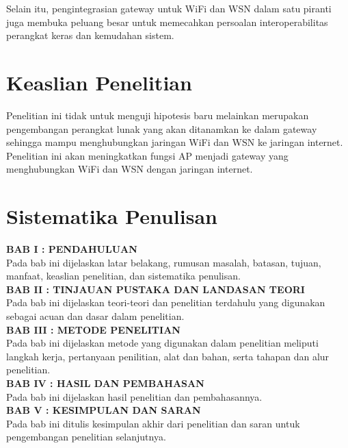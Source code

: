 Selain itu, pengintegrasian gateway untuk WiFi dan WSN dalam satu piranti juga membuka peluang besar untuk memecahkan persoalan interoperabilitas perangkat keras dan kemudahan sistem.


\section{Keaslian Penelitian}
Penelitian ini tidak untuk menguji hipotesis baru melainkan merupakan pengembangan perangkat lunak yang akan ditanamkan ke dalam gateway sehingga mampu menghubungkan jaringan WiFi dan WSN ke jaringan internet. Penelitian ini akan meningkatkan fungsi AP menjadi gateway yang menghubungkan WiFi dan WSN dengan jaringan internet.


\section{Sistematika Penulisan}
\noindent
\textbf{BAB I : PENDAHULUAN}\\
Pada bab ini dijelaskan latar belakang, rumusan masalah, batasan, tujuan, manfaat, keaslian penelitian, dan sistematika penulisan.\\

\noindent
\textbf{BAB II : TINJAUAN PUSTAKA DAN LANDASAN TEORI}\\
Pada bab ini dijelaskan teori-teori dan penelitian terdahulu yang digunakan sebagai acuan dan dasar dalam penelitian.\\

\noindent
\textbf{BAB III : METODE PENELITIAN}\\
Pada bab ini dijelaskan metode yang digunakan dalam penelitian meliputi langkah kerja, pertanyaan penilitian, alat dan bahan, serta tahapan dan alur penelitian.\\

\noindent
\textbf{BAB IV : HASIL DAN PEMBAHASAN}\\
Pada bab ini dijelaskan hasil penelitian dan pembahasannya.\\

\noindent
\textbf{BAB V : KESIMPULAN DAN SARAN}\\
Pada bab ini ditulis kesimpulan akhir dari penelitian dan saran untuk pengembangan penelitian selanjutnya.\\
